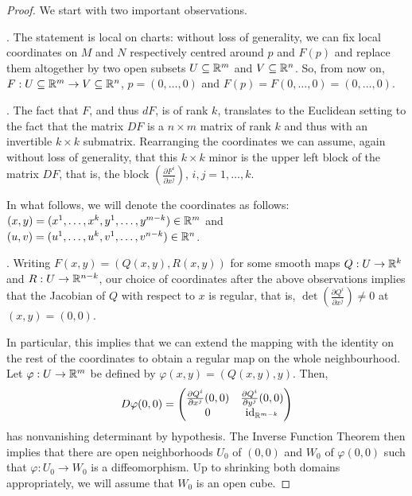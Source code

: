 \begin{proof}
	We start with two important observations.

	. The statement is local on charts: without loss of generality,
	we can fix local coordinates on $M$ and $N$ respectively centred around $p$ and $F(p)$
	and replace them altogether by two open subsets $U\subseteq \mathbb{R}^m$ and $V \subseteq \mathbb{R}^n$.
	So, from now on, $F: U \subseteq \mathbb{R}^m \to V \subseteq \mathbb{R}^n$, $p=(0,\ldots,0)$
	and $F(p) = F(0,\ldots,0) = (0,\ldots,0)$.

	. The fact that $F$, and thus $dF$, is of rank $k$, translates to
	the Euclidean setting to the fact that the matrix $DF$ is a $n\times m$ matrix of rank $k$
	and thus with an invertible $k\times k$ submatrix.
	Rearranging the coordinates we can assume, again without loss of generality, that this
	$k\times k$ minor is the upper left block of the matrix $DF$, that is, the block
	$\left( \frac{\partial F^i}{\partial x^j} \right)$, $i,j = 1,\ldots, k$.

	In what follows, we will denote the coordinates as follows:
	$(x,y) = (x^1, \ldots, x^k, y^1, \ldots, y^{m-k})\in\mathbb{R}^m$
	and $(u,v) = (u^1, \ldots, u^k, v^1, \ldots, v^{n-k})\in\mathbb{R}^n$.
	\medskip

	.
	Writing $F(x,y) = (Q(x,y), R(x,y))$ for some smooth maps $Q: U \to \mathbb{R}^k$ and $R: U \to \mathbb{R}^{n-k}$,
	our choice of coordinates after the above observations implies that the Jacobian of $Q$ with respect to $x$ is regular, that is,
	$\det \left( \frac{\partial Q^i}{\partial x^j} \right) \neq 0$ at $(x,y) = (0,0)$.

	In particular, this implies that we can extend the mapping with
	the identity on the rest of the coordinates to obtain a regular map
	on the whole neighbourhood.
	Let $\varphi : U \to \mathbb{R}^m$ be defined by $\varphi(x,y) = (Q(x,y), y)$. Then,
	\begin{equation}
		D\varphi(0,0) =
		\begin{pmatrix}
			\frac{\partial Q^i}{\partial x^j}(0,0) & \frac{\partial Q^i}{\partial y^j}(0,0) \\
			0                                      & \operatorname{id}_{\mathbb{R}^{m-k}}
		\end{pmatrix}
	\end{equation}
	has nonvanishing determinant by hypothesis.
	The Inverse Function Theorem then implies that there are open neighborhoods $U_0$ of $(0,0)$
	and $W_0$ of $\varphi(0,0)$ such that $\varphi : U_0 \to W_0$ is a diffeomorphism.
	Up to shrinking both domains appropriately, we will assume that $W_0$ is an open cube.


\end{proof}
